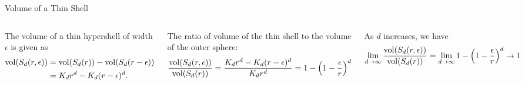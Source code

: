 \begin{frame}{Volume of a Thin Shell}

  \begin{columns}
The volume of a thin hypershell of width
$\epsilon$ is given as
\begin{align*}
  \vol(S_d(r,\epsilon)) & = \vol(S_d(r)) - \vol(S_d(r - \epsilon))\\
  & = K_d r^d - K_d (r -\epsilon)^d.
\end{align*}

The ratio of volume of the thin shell to the
volume of the outer sphere:
\begin{align*}
\frac{\vol(S_d(r,\epsilon))}{\vol(S_d(r))} =
\frac{K_d r^d - K_d (r-\epsilon)^d}{K_d r^d} =
1 - \lB(1-\frac{\epsilon}{r}\rB)^d
\end{align*}

As $d$ increases, we have
\begin{align*}
\lim_{d\to \infty} \frac{\vol(S_d(r,\epsilon))}{\vol(S_d(r))} =
\lim_{d\to \infty} 1 - \lB(1-\frac{\epsilon}{r}\rB)^d \to 1
\end{align*}


	\normalsize
\centerline{
}
\end{columns}
\end{frame}



